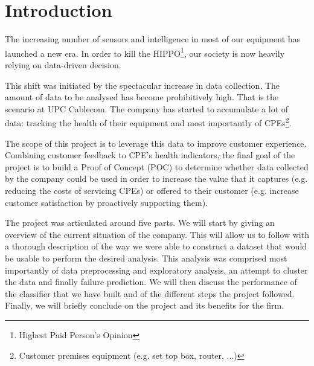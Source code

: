 
\chapter*{Introduction}
The increasing number of sensors and intelligence in most of our equipment has launched a new era. In order to kill the HIPPO\footnote{Highest Paid Person's Opinion}, our society is now heavily relying on data-driven decision. 

This shift was initiated by the spectacular increase in data collection. The amount of data to be analysed has become prohibitively high. That is the scenario at UPC Cablecom. The company has started to accumulate a lot of data: tracking the health of their equipment and most importantly of CPEs\footnote{Customer premises equipment (e.g. set top box, router, ...)}. 

The scope of this project is to leverage this data to improve customer experience. Combining customer feedback to CPE's health indicators, the final goal of the project is to build a Proof of Concept (POC) to determine whether data collected by the company could be used in order to increase the value that it captures (e.g. reducing the costs of servicing CPEs) or offered to their customer (e.g. increase customer satisfaction by proactively supporting them).

The project was articulated around five parts. We will start by giving an overview of the current situation of the company. This will allow us to follow with a thorough description of the way we were able to construct a dataset that would be usable to perform the desired analysis. This analysis was comprised most importantly of data preprocessing and exploratory analysis, an attempt to cluster the data and finally failure prediction. We will then discuss the performance of the classifier that we have built and of the different steps the project followed. Finally, we will briefly conclude on the project and its benefits for the firm. 

